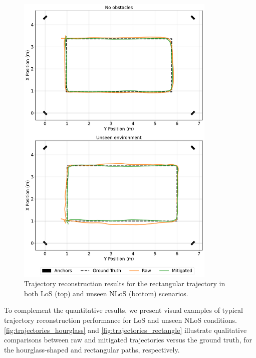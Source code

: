 \begin{figure}[tbh]
    \centering
    \includegraphics[width=0.85\textwidth]{Figures/experiments_and_results/rect_trajectory.pdf}
    \caption{Trajectory reconstruction results for the rectangular trajectory in both LoS (top) and unseen NLoS (bottom) scenarios.}
    \label{fig:trajectories_rectangle}
\end{figure}


To complement the quantitative results, we present visual examples of typical trajectory reconstruction performance for LoS and unseen NLoS conditions. \autoref{fig:trajectories_hourglass} and \autoref{fig:trajectories_rectangle} illustrate qualitative comparisons between raw and mitigated trajectories versus the ground truth, for the hourglass-shaped and rectangular paths, respectively.

